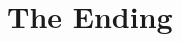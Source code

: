\documentclass[
 size=12pt,
 paper=smartboard, %
 mode=present, %
 display=slides, %
style=tuliplab,
pauseslide,
fleqn,leqno]{powerdot}
\begin{document}
  \section{The Ending}
\end{document}
